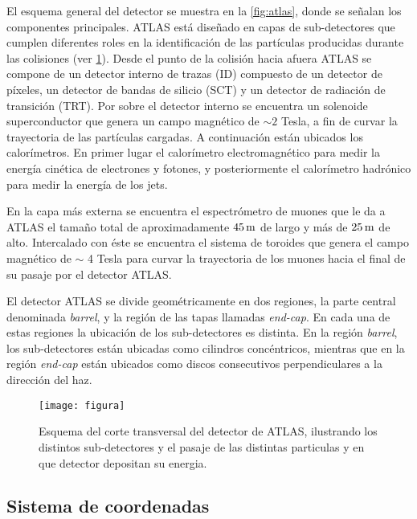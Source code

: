 El esquema general del detector se muestra en la \cref{fig:atlas}, donde se
señalan los componentes principales. ATLAS está diseñado en capas de
sub-detectores que cumplen diferentes roles en la identificación de las
partículas producidas durante las colisiones (ver \cref{fig:how_atlas_works}).
Desde el punto de la colisión
hacia afuera ATLAS se compone de un detector interno de trazas (ID) compuesto de
un detector de píxeles, un detector de bandas de silicio (SCT) y un detector de
radiación de transición (TRT).
Por sobre el detector interno se encuentra un
solenoide superconductor que genera un campo magnético de $\sim 2$ Tesla, a fin
de curvar la trayectoria de las partículas cargadas.
A continuación están ubicados los calorímetros. En primer lugar el calorímetro
electromagnético para medir la energía cinética de electrones y fotones, y
posteriormente el calorímetro hadrónico para medir la energía de los jets.

En la capa más externa se encuentra el espectrómetro de muones que le da a ATLAS
el tamaño total de aproximadamente $\unit[45]{m}$ de largo y más de
$\unit[25]{m}$ de alto. Intercalado con éste se encuentra el sistema de toroides
que genera el campo magnético de $\sim$ 4 Tesla para curvar la trayectoria de
los muones hacia el final de su pasaje por el detector ATLAS.

El detector ATLAS se divide geométricamente en dos regiones, la parte central
denominada \emph{barrel}, y la región de las tapas llamadas \emph{end-cap}.
En cada una de estas regiones la ubicación de los
sub-detectores es distinta. En la región \emph{barrel}, los sub-detectores están
ubicadas como cilindros concéntricos, mientras que en la región \emph{end-cap}
están ubicados como discos consecutivos perpendiculares a la dirección del haz.


\begin{figure}[!htbp]
  \centering

  \texttt{[image: figura]} %

  \caption{Esquema del corte transversal del detector de ATLAS, ilustrando los distintos
  sub-detectores y el pasaje de las distintas particulas y en que detector depositan su energia.}
  \label{fig:how_atlas_works}

\end{figure}

\subsection{Sistema de coordenadas}

